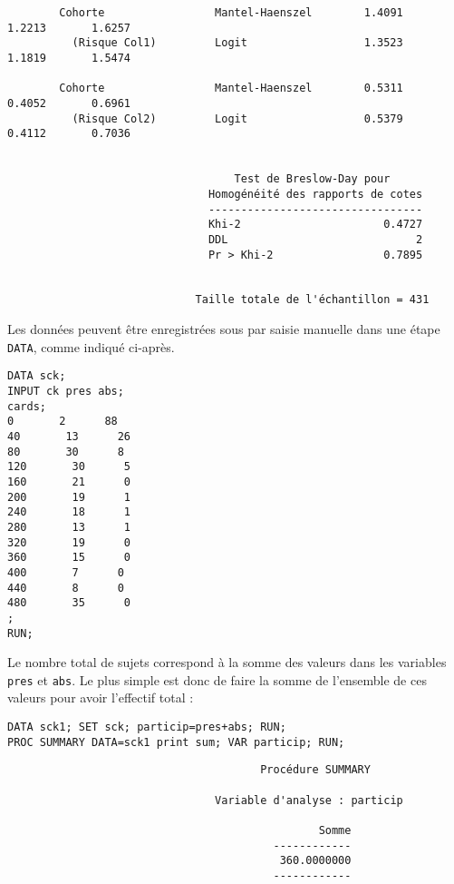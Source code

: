 \begin{verbatim}
        Cohorte                 Mantel-Haenszel        1.4091       1.2213       1.6257
          (Risque Col1)         Logit                  1.3523       1.1819       1.5474

        Cohorte                 Mantel-Haenszel        0.5311       0.4052       0.6961
          (Risque Col2)         Logit                  0.5379       0.4112       0.7036


                                   Test de Breslow-Day pour
                               Homogénéité des rapports de cotes
                               ---------------------------------
                               Khi-2                      0.4727
                               DDL                             2
                               Pr > Khi-2                 0.7895


                             Taille totale de l'échantillon = 431
\end{verbatim}

\soln{\ref{exo:10.5}} Les données peuvent être enregistrées sous \SAS par
saisie manuelle dans une étape \texttt{DATA}, comme indiqué ci-après.
\begin{verbatim}
DATA sck;
INPUT ck pres abs;
cards;
0       2      88
40       13      26
80       30      8
120       30      5
160       21      0
200       19      1
240       18      1
280       13      1
320       19      0
360       15      0
400       7      0
440       8      0
480       35      0
;
RUN;
\end{verbatim}

Le nombre total de sujets correspond à la somme des valeurs dans les
variables \texttt{pres} et \texttt{abs}. Le plus simple est donc de faire la
somme de l'ensemble de ces valeurs pour avoir l'effectif total :
\begin{verbatim}
DATA sck1; SET sck; particip=pres+abs; RUN;
PROC SUMMARY DATA=sck1 print sum; VAR particip; RUN;
\end{verbatim}

\begin{verbatim}
                                       Procédure SUMMARY

                                Variable d'analyse : particip

                                                Somme
                                         ------------
                                          360.0000000
                                         ------------
\end{verbatim}

